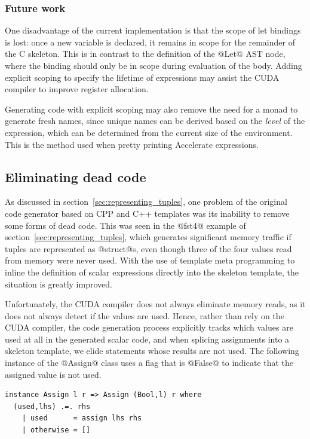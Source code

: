 \subsubsection{Future work}

One disadvantage of the current implementation is that the scope of let bindings
is lost: once a new variable is declared, it remains in scope for the remainder
of the C skeleton. This is in contrast to the definition of the @Let@ AST
node, where the binding should only be in scope during evaluation of the body.
Adding explicit scoping to specify the lifetime of expressions may assist the
CUDA compiler to improve register allocation.


Generating code with explicit scoping may also remove the need for a monad to
generate fresh names, since unique names can be derived based on the  \emph{level} of the expression, which can be determined from the current
size of the environment. This is the method used when pretty printing Accelerate
expressions.


\subsection{Eliminating dead code}
\label{sec:eliminating_dead_code}

As discussed in section~\ref{sec:representing_tuples}, one problem of the
original code generator based on CPP and C++ templates was its inability to
remove some forms of dead code. This was seen in the @fst4@ example of
section~\ref{sec:representing_tuples}, which generates significant memory
traffic if tuples are represented as @struct@s, even though three of the
four values read from memory were never used. With the use of template meta
programming to inline the definition of scalar expressions directly into the
skeleton template, the situation is greatly improved.

Unfortunately, the CUDA compiler does not always eliminate memory reads, as it
does not always detect if the values are used. Hence, rather than rely on the
CUDA compiler, the code generation process explicitly tracks which values are
used at all in the generated scalar code, and when splicing assignments into a
skeleton template, we elide statements whose results are not used. The following
instance of the @Assign@ class uses a flag that is @False@ to indicate
that the assigned value is not used.
%
\begin{lstlisting}[style=haskell]
instance Assign l r => Assign (Bool,l) r where
  (used,lhs) .=. rhs
    | used      = assign lhs rhs
    | otherwise = []
\end{lstlisting}

